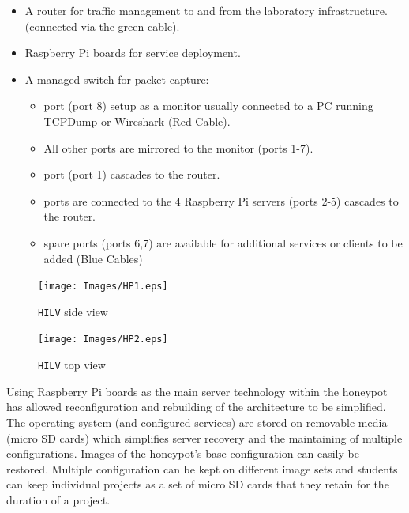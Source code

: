 \begin{itemize}
\item \noindent A router for traffic management to and from the laboratory infrastructure. (connected via the green cable).
\item {} Raspberry Pi boards for service deployment.
\item \noindent A managed switch for packet capture:
\begin{itemize}
	\item {} port (port 8) setup as a monitor usually connected to a PC running TCPDump or Wireshark (Red Cable).
	\item \noindent All other ports are mirrored to the monitor (ports 1-7). 
	\item {} port (port 1) cascades to the router. 
	\item {} ports are connected to the 4 Raspberry Pi servers (ports 2-5) cascades to the router. 
	\item {} spare ports (ports 6,7) are available for additional services or clients to be added (Blue Cables)
\end{itemize}
\end{itemize}

\begin{figure}[!ht]
  \centering
  \begin{minipage}[h]{0.45\textwidth}
    \texttt{[image: Images/HP1.eps]}
    \caption{\texttt{HILV} side view}
    \label{fig:HP1}
  \end{minipage}
  \hfill
  \begin{minipage}[h]{0.45\textwidth}
    \texttt{[image: Images/HP2.eps]}
    \caption{\texttt{HILV} top view}
    \label{fig:HP2}
  \end{minipage}
\end{figure}


Using Raspberry Pi boards as the main server technology within the honeypot has allowed reconfiguration and rebuilding of the architecture to be simplified. The operating system (and configured services) are stored on removable media (micro SD cards) which simplifies server recovery and the maintaining of multiple configurations. Images of the honeypot's base configuration can easily be restored. Multiple configuration can be kept on different image sets and students can keep individual projects as a set of micro SD cards that they retain for the duration of a project.

